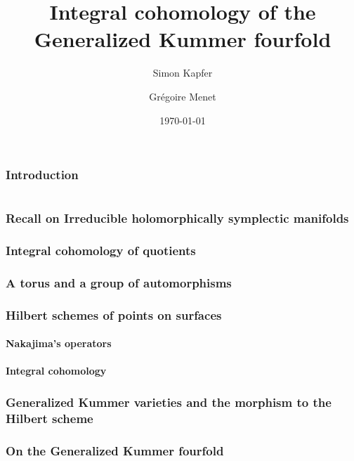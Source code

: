 \documentclass{amsart}
\begin{document}
\title{Integral cohomology of the Generalized Kummer fourfold}


\author{Simon Kapfer}
\author{Gr\'egoire Menet}
\address{Simon Kapfer, Institut f\"ur Mathematik, Universit\"at Augsburg, D--86159 Augsburg}


\date{\today}

\maketitle
\section{Introduction}
\part{}
\section{Recall on Irreducible holomorphically symplectic manifolds}
\section{Integral cohomology of quotients}
\section{A torus and a group of automorphisms}
\section{Hilbert schemes of points on surfaces}
	\subsection{Nakajima's operators}
	\subsection{Integral cohomology}
\section{Generalized Kummer varieties and the morphism to the Hilbert scheme}
\section{On the Generalized Kummer fourfold}
\end{document}
